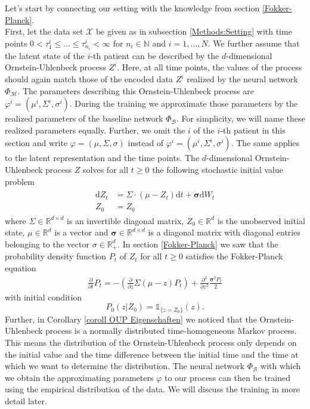 \documentclass[11pt,titlepage]{article}
\newcommand{\R}{\mathbb{R}} %
\newcommand{\N}{\mathbb{N}} %
\theoremstyle{definition}
\theoremstyle{remark}
\begin{document}
	Let's start by connecting our setting with the knowledge from section \ref{Fokker-Planck}.\\
	First, let the data set $\mathcal{X}$ be given as in subsection \ref{Methods:Setting} with time points $0<\tau^i_1\leq \ldots\leq \tau^i_{n_i}<\infty$ for $n_i\in\N$ and $i=1,\ldots,N$. We further assume that the latent state of the $i$-th patient can be described by the $d$-dimensional Ornstein-Uhlenbeck process $Z^i$. Here, at all time points, the values of the process should again match those of the encoded data $Z^i$ realized by the neural network $\Phi_\mathcal{M}$. 
	The parameters describing this Ornstein-Uhlenbeck process are $\varphi^i = (\mu^i, \Sigma^i, \sigma^i)$. During the training we approximate those parameters by the realized parameters of the baseline network $\Phi_\mathcal{B}$. 
	For simplicity, we will name these realized parameters equally. Further, we omit the $i$ of the $i$-th patient in this section and write $\varphi = (\mu, \Sigma, \sigma)$ instead of $\varphi^i = (\mu^i, \Sigma^i, \sigma^i)$. The same applies to the latent representation and the time points. 
	The $d$-dimensional Ornstein-Uhlenbeck process $Z$ solves for all $t\geq 0$ the following stochastic initial value problem
	\begin{align*}
		\begin{split}
			\mathrm{d}Z_t &= \Sigma\cdot (\mu-Z_t)\mathrm{d}t +\boldsymbol{\sigma} \mathrm{d}W_t\\
			Z_0&=Z_0
		\end{split}
	\end{align*}
	where $\Sigma\in\R^{d\times d}$ is an invertible diagonal matrix, $Z_0\in\R^d$ is the unobserved initial state, $\mu\in\R^d$ is a vector and $\boldsymbol{\sigma}\in\R^{d\times d}$ is a diagonal matrix with diagonal entries belonging to the vector $\sigma\in\R_+^d$. In section \ref{Fokker-Planck} we saw that 
	the probability density function $P_t$ of $Z_t$ for all $t\geq 0$ satisfies the Fokker-Planck equation
	\begin{align}
		\frac{\partial}{\partial t}P_{t} = -\left(\frac{\partial}{\partial z}\Sigma(\mu-z)P_{t}\right) + \frac{\partial^2}{\partial z^2}\frac{\boldsymbol{\sigma}^2 P_{t}}{2}
		\label{Fokker-Planck Eq}
	\end{align}
	with initial condition
	\[P_0(z\vert Z_0)=\mathds{1}_{\{z=Z_0\}}(z).\]
	Further, in Corollary \ref{coroll OUP Eigenschaften} we noticed that the Ornstein-Uhlenbeck process is a normally distributed time-homogeneous Markov process. This means the distribution of the Ornstein-Uhlenbeck process only depends on the initial value and the time difference between the initial time and the time at which we want to determine the distribution. The neural network $\Phi_\mathcal{B}$ with which we obtain the approximating parameters $\varphi$ to our process can then be trained using the empirical distribution of the data. We will discuss the training in more detail later.
\end{document}
